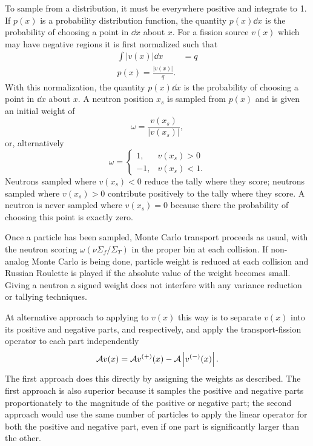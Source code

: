 To sample from a distribution, it must be everywhere positive and integrate to 1.  If $p(x)$ is a probability distribution function, the quantity $p(x)\dd x$ is the probability of choosing a point in $\dd x$ about $x$.  For a fission source $v(x)$ which may have negative regions it is first normalized such that
\begin{subequations}\begin{align}
    \int \left|v(x)\right| \dd x &= q \\
    p(x) = \frac{\left|v(x)\right|}{q}.
    \label{eq:FissionSourceNormalization}
\end{align}\end{subequations}
With this normalization, the quantity $p(x) \dd x$ is the probability of choosing a point in $\dd x$ about $x$.  A neutron position $x_s$ is sampled from $p(x)$ and is given an initial weight of
\begin{equation}
    \omega = \frac{v(x_s)}{\left|v(x_s)\right|}, 
    \label{eq:InitialWeight}
\end{equation}
or, alternatively
\begin{equation}
    \omega = \begin{cases}
        1, & v(x_s) > 0 \\
        -1, & v(x_s) < 1.
    \end{cases}
    \label{eq:OtherInitialWeight}
\end{equation}
Neutrons sampled where \mbox{$v(x_s) < 0$} reduce the tally where they score; neutrons sampled where \mbox{$v(x_s) > 0$} contribute positively to the tally where they score.  A neutron is never sampled where \mbox{$v(x_s) = 0$} because there the probability of choosing this point is exactly zero.

Once a particle has been sampled, Monte Carlo transport proceeds as usual, with the neutron scoring $\omega\left(\nu\Sigma_f/\Sigma_T\right)$ in the proper bin at each collision.  If non-analog Monte Carlo is being done, particle weight is reduced at each collision and Russian Roulette is played if the absolute value of the weight becomes small.  Giving a neutron a signed weight does not interfere with any variance reduction or tallying techniques.

At alternative approach to applying \A{} to $v(x)$ this way is to separate $v(x)$ into its positive and negative parts, \vp{} and \vm{} respectively, and apply the transport-fission operator to each part independently
\begin{equation}
    \mathcal{A} v(x) = \mathcal{A}v^{(+)}(x) - \mathcal{A}\left|v^{(-)}(x)\right|.
\end{equation}
The first approach does this directly by assigning the weights as described.  The first approach is also superior because it samples the positive and negative parts proportionately to the magnitude of the positive or negative part; the second approach would use the same number of particles to apply the linear operator for both the positive and negative part, even if one part is significantly larger than the other.  

